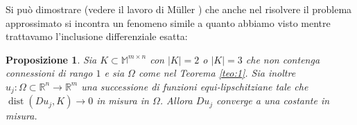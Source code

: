 \documentclass[a4paper,11pt]{book}
\theoremstyle{plain}
\newtheorem{prop}[teo]{Proposizione}
\theoremstyle{definition}
\theoremstyle{remark}
\newcommand{\R}{\mathbb{R}}
\newcommand{\M}{\mathbb{M}}
\newcommand{\LL}{\mathscr{L}}
\newcommand{\weakconvs}{\overset{\ast}{\rightharpoonup}}
\newcommand{\dx}{\text{d}x}
\DeclareMathOperator{\dist}{dist}
\begin{document}
\begin{comment}
\begin{proof}
NON SO SE FUNZIONA!!!!!!!!!!!!!!!!!!!!!!!\\
	Possiamo assumere che $A = 0$, dalle ipotesi segue che esistono degli insiemi $E_j$ tali che
	\[
		Du_j-B\chi_E\to 0\quad\text{in misura}
	\]
	Dato che le funzioni hanno costante di Lipschitz uniformemente limitata la convergenza avviene anche in $L^p$ per ogni $1\leq p<\infty$. Inoltre dalla compattezza debole delle palle chiuse di $L^{\infty}(\Omega)$ esiste una sottosuccessione (che non rinominiamo) tale che
	\[
		\chi_{E_j}\weakconvs \theta\quad \text{in }L^{\infty}(\Omega)
	\]
	dove ricordiamo che $\chi_{E_j}\weakconvs\theta$ in $L^{\infty}(\Omega)$ significa che per ogni $g\in L^1(\Omega)$ si ha che
	\[
		\int_{\Omega}\chi_{E_j}(x)g(x)\dx \to\int_{\Omega} \theta(x)g(x)\dx
	\]
	Mostriamo ora che $\theta=\chi_E$ per qualche $E$: è immediato verificare che $\theta(x)\geq 0$ q.o., infatti se l'insieme $A=\{\theta<-\epsilon<0\}$ avesse misura positiva, allora prendiamo come funzione di test $g=\chi_A$, ma 
	\[
		\int_{\Omega} \theta(x)\chi_A\dx < -\epsilon\LL(A) < 0\qquad \text{mentre}\qquad \forall j\ \int_{\Omega}\chi_{E_j}(x)\chi_A(x)\dx\geq 0
	\]
	quindi non possiamo avere convergenza. Un ragionamento analogo mostra che $\theta(x)\leq 1$ q.o. Supponiamo ora che esistano due costanti $0<a < b < 1$ tali che l'insieme $A=\{a<\theta<b\}$ abbia misura positiva, possiamo inoltre supporre che $\LL(A)<\infty$ eventualmente troncandolo. Utilizzando come prima $g=\chi_A$ avremmo che, detto $\displaystyle c= \int_{\Omega} \theta(x)\chi_A(x)\dx$, allora
	\begin{equation}\label{eq:5}
		0<c<\LL(A)\qquad \text{e}\qquad \LL(E_j\cap A) = \int_{\Omega}\chi_{E_j}\chi_A\dx\to c
	\end{equation}
	Consideriamo $F = \limsup_{j\to\infty}(E_j\cap A)$, se $\LL(F) = 0$ allora grazie al lemma di Fatou (che possiamo applicare grazie all'ipotesi che $\LL(A)<\infty$) avremmo
	\[
		\limsup_{j\to \infty} \LL(E_j\cap A) \leq \LL\left(\limsup_{j\to\infty}(E_j\cap A) \right) = 0
	\]
	ma allora $c=0$ contro la \eqref{eq:5}. Se invece $\LL(F) > 0$ allora prendiamo come $g=\chi_F$, ma avrei che
	\[
		\int_{\Omega}\chi_{E_j}(x)\chi_F(x)\dx = \LL(E_j\cap F) = \LL(F)\qquad \text{mentre}\qquad\int_{\Omega} \theta(x)\chi_F(x)\dx < \LL(F)
	\]
	

\end{proof}
\end{comment}

Si può dimostrare (vedere il lavoro di M{\"u}ller \cite{muller}) che anche nel risolvere il problema approssimato si incontra un fenomeno simile a quanto abbiamo visto mentre trattavamo l'inclusione differenziale esatta:
\begin{prop}
	Sia $K\subset\M^{m\times n}$ con $|K|=2$ o $|K|=3$ che non contenga connessioni di rango $1$ e sia $\Omega$ come nel Teorema \ref{teo:1}. Sia inoltre $u_{j}:\Omega\subset \R^{n}\to\R^{m}$ una successione di funzioni equi-lipschitziane tale che $\dist(Du_{j},K)\to 0$ in misura in $\Omega$. Allora $Du_{j}$ converge a una costante in misura.
\end{prop}
\end{document}
